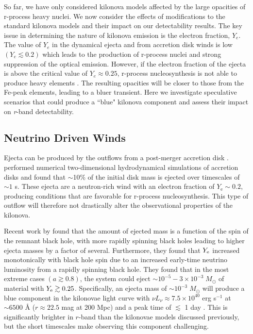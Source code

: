 So far, we have only considered kilonova models affected by the large opacities of r-process heavy nuclei. We now consider the effects of modifications to the standard kilonova models and their impact on our detectability results. The key issue in determining the nature of kilonova emission is the electron fraction, $Y_e$. The value of $Y_e$ in the dynamical ejecta and from accretion disk winds is low $(Y_e \lesssim 0.2)$ which leads to the production of r-process nuclei and strong suppression of the optical emission. However, if the electron fraction of the ejecta is above the critical value of $Y_e \approx 0.25$, r-process nucleosynthesis is not able to produce heavy elements \citep[particularly the lanthanides][]{Kasen+15}. The resulting opacities will be closer to those from the Fe-peak elements, leading to a bluer transient. Here we investigate speculative scenarios that could produce a ``blue" kilonova component and assess their impact on {\em r}-band detectability.

\subsection{Neutrino Driven Winds}
\label{sec:ch2_neutrino}
Ejecta can be produced by the outflows from a post-merger accretion disk \citep{Dessart+09,FernandezMetzger13,Fernandez+15}. \citet{FernandezMetzger13} performed numerical two-dimensional hydrodynamical simulations of accretion disks and found that $\sim$10\% of the initial disk mass is ejected over timescales of $\sim1$ s. These ejecta are a neutron-rich wind with an electron fraction of $Y_{\text{e}} \sim 0.2$, producing conditions that are favorable for r-process nucleosynthesis. This type of outflow will therefore not drastically alter the observational properties of the kilonova.

\clearpage
Recent work by \citet{Fernandez+15} found that the amount of ejected mass is a function of the spin of the remnant black hole, with more rapidly spinning black holes leading to higher ejecta masses by a factor of several. Furthermore, they found that $Y_{{\rm e}}$ increased monotonically with black hole spin due to an increased early-time neutrino luminosity from a rapidly spinning black hole. They found that in the most extreme cases $(a \gtrsim 0.8)$, the system could eject $\sim10^{-5} - 3\times10^{-3}\;M_{\odot}$ of material with $Y_{{\rm e}} \gtrsim 0.25$. Specifically, an ejecta mass of $\sim10^{-3}\;M_{\odot}$ will produce a blue component in the kilonovae light curve with $\nu L_{\nu} \approx 7.5\times10^{40}$ erg s$^{-1}$ at $\sim6500$ \AA \; ($r \approx 22.5$ mag at 200 Mpc) and a peak time of $\lesssim$ 1 day \citep{Kasen+15}. This is significantly brighter in $r$-band than the kilonovae models discussed previously, but the short timescales make observing this component challenging.

